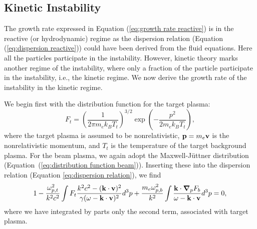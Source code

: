 \documentclass[usenatbib,iop,apj,numberedappendix]{aeb_emulateapj_2015}
\newcommand\bmath[1] {\mbox{\boldmath$\rm #1$}}
\newcommand{\vel}{\ensuremath{\bmath{v}}}
\newcommand{\pmom}{\ensuremath{\bmath{p}}}
\newcommand{\gradp}{\ensuremath{\bmath{\nabla}_p}}
\newcommand{\betavec}{\ensuremath{\bmath{\beta}}}
\newcommand{\kvec}{\ensuremath{\bmath{k}}}
\newcommand{\betabeam}{\ensuremath{\bmath{\beta}_{\rm b}}}
\newcommand{\gammabeam}{\ensuremath{\gamma_{\rm b}}}
\begin{document}
\subsection{Kinetic Instability}

The growth rate expressed in Equation (\ref{eq:growth rate reactive}) is in the reactive (or hydrodynamic) regime as the dispersion relation (Equation (\ref{eq:dispersion reactive})) could have been derived from the fluid equations.  Here all the particles participate in the instability.  However, kinetic theory marks another regime of the instability, where only a fraction of the particle participate in the instability, i.e., the kinetic regime.  We now derive the growth rate of the instability in the kinetic regime.

We begin first with the distribution function for the target plasma:
\begin{equation}
 F_t = \left(\frac{1}{2\pi m_e k_B T_t}\right)^{3/2}\exp\left(-\frac{p^2}{2m_e k_B T_t}\right),
\end{equation}
where the target plasma is assumed to be nonrelativistic, $\bmath{p}=m_e\vel$ is the nonrelativistic momentum,  and $T_t$ is the temperature of the target background plasma.
For the beam plasma, we again adopt the Maxwell-J{\"u}ttner distribution (Equation~(\ref{eq:distribution function beam})).
Inserting these into the dispersion relation (Equation \ref{eq:dispersion relation}), we find
\begin{equation}\label{eq:dispersion kinetic}
 1 - \frac{\omega_{p,t}^2}{k^2c^2}\int F_t\frac{k^2c^2 - (\kvec\cdot\vel)^2}{\gamma(\omega - \kvec\cdot\vel)^2} d^3p + \frac{m_e\omega_{p,b}^2}{k^2}\int \frac{\kvec\cdot\gradp F_b}{\omega - \kvec\cdot\vel}d^3p  = 0,
\end{equation}
where we have integrated by parts only the second term, associated with target plasma. 
\end{document}
